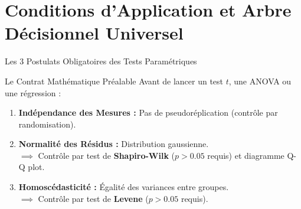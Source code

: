 \documentclass[aspectratio=169,10pt]{beamer}
\begin{document}
\section{Conditions d'Application et Arbre Décisionnel Universel}

\begin{frame}{Les 3 Postulats Obligatoires des Tests Paramétriques}
  \begin{conceptbox}{Le Contrat Mathématique Préalable}
    Avant de lancer un test $t$, une ANOVA ou une régression :
  \end{conceptbox}
  \vspace{1.5mm}
  \begin{enumerate}\setlength{\itemsep}{2pt}
    \item \textbf{\color{BioNavy}Indépendance des Mesures :} Pas de pseudoréplication (contrôle par randomisation).
    \item \textbf{\color{BioTeal}Normalité des Résidus :} Distribution gaussienne.\\
      $\implies$ Contrôle par test de \textbf{Shapiro-Wilk} ($p > 0.05$ requis) et diagramme Q-Q plot.
    \item \textbf{\color{BioAmber}Homoscédasticité :} Égalité des variances entre groupes.\\
      $\implies$ Contrôle par test de \textbf{Levene} ($p > 0.05$ requis).
  \end{enumerate}
\end{frame}
\end{document}
